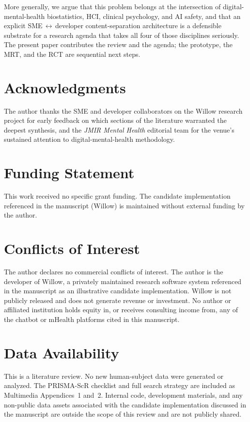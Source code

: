 \documentclass[11pt,a4paper]{article}
\begin{document}
More generally, we argue that this problem belongs at the
intersection of digital-mental-health biostatistics, HCI, clinical
psychology, and AI safety, and that an explicit
SME$\,\leftrightarrow\,$developer content-separation architecture
is a defensible substrate for a research agenda that takes all
four of those disciplines seriously. The present paper contributes
the review and the agenda; the prototype, the MRT, and the RCT are
sequential next steps.


\section*{Acknowledgments}\label{sec:ack}
The author thanks the SME and developer collaborators on the
Willow research project for early feedback on which sections of
the literature warranted the deepest synthesis, and the
\emph{JMIR Mental Health} editorial team for the venue's
sustained attention to digital-mental-health methodology.

\section*{Funding Statement}\label{sec:funding}
This work received no specific grant funding. The candidate
implementation referenced in the manuscript (Willow) is maintained
without external funding by the author.

\section*{Conflicts of Interest}\label{sec:coi}
The author declares no commercial conflicts of interest. The
author is the developer of Willow, a privately maintained research
software system referenced in the manuscript as an illustrative
candidate implementation. Willow is not publicly released and does
not generate revenue or investment. No author or affiliated institution holds equity in,
or receives consulting income from, any of the chatbot or
mHealth platforms cited in this manuscript.

\section*{Data Availability}\label{sec:data-availability}
This is a literature review. No new human-subject data were
generated or analyzed. The PRISMA-ScR checklist and full search
strategy are included as Multimedia Appendices~1 and~2. Internal
code, development materials, and any non-public data assets
associated with the candidate implementation discussed in the
manuscript are outside the scope of this review and are not
publicly shared.
\end{document}
